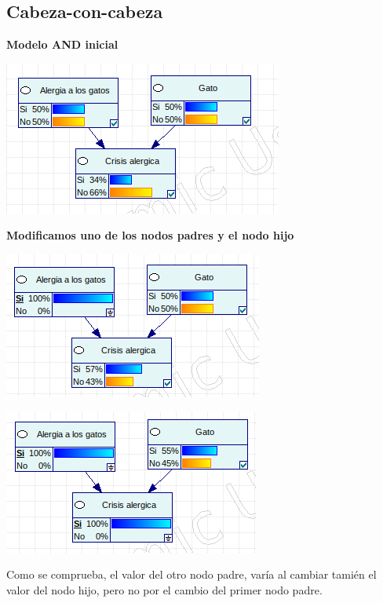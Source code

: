 \documentclass{article}
\begin{document}
\subsection{\textbf{Cabeza-con-cabeza}}

\textbf{Modelo AND inicial}

\begin{center}
\includegraphics[scale=0.5]{AND1.png}
\end{center}

\textbf{Modificamos uno de los nodos padres y el nodo hijo}

\begin{center}
\includegraphics[scale=0.5]{AND2.png}
\end{center}

\begin{center}
\includegraphics[scale=0.5]{AND3.png}
\end{center}

Como se comprueba, el valor del otro nodo padre, varía al cambiar tamién el valor del nodo hijo, pero no por el cambio del primer nodo padre.\\
\end{document}
